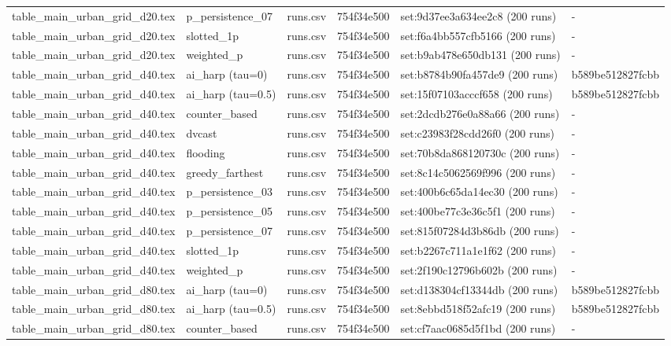 \begin{tabular}{llllll}
table\_main\_urban\_grid\_d20.tex & p\_persistence\_07 & runs.csv & 754f34e500 & set:9d37ee3a634ee2c8 (200 runs) & - \\
table\_main\_urban\_grid\_d20.tex & slotted\_1p & runs.csv & 754f34e500 & set:f6a4bb557cfb5166 (200 runs) & - \\
table\_main\_urban\_grid\_d20.tex & weighted\_p & runs.csv & 754f34e500 & set:b9ab478e650db131 (200 runs) & - \\
table\_main\_urban\_grid\_d40.tex & ai\_harp (tau=0) & runs.csv & 754f34e500 & set:b8784b90fa457de9 (200 runs) & b589be512827fcbb \\
table\_main\_urban\_grid\_d40.tex & ai\_harp (tau=0.5) & runs.csv & 754f34e500 & set:15f07103acccf658 (200 runs) & b589be512827fcbb \\
table\_main\_urban\_grid\_d40.tex & counter\_based & runs.csv & 754f34e500 & set:2dcdb276e0a88a66 (200 runs) & - \\
table\_main\_urban\_grid\_d40.tex & dvcast & runs.csv & 754f34e500 & set:c23983f28cdd26f0 (200 runs) & - \\
table\_main\_urban\_grid\_d40.tex & flooding & runs.csv & 754f34e500 & set:70b8da868120730c (200 runs) & - \\
table\_main\_urban\_grid\_d40.tex & greedy\_farthest & runs.csv & 754f34e500 & set:8c14c5062569f996 (200 runs) & - \\
table\_main\_urban\_grid\_d40.tex & p\_persistence\_03 & runs.csv & 754f34e500 & set:400b6c65da14ec30 (200 runs) & - \\
table\_main\_urban\_grid\_d40.tex & p\_persistence\_05 & runs.csv & 754f34e500 & set:400be77c3e36c5f1 (200 runs) & - \\
table\_main\_urban\_grid\_d40.tex & p\_persistence\_07 & runs.csv & 754f34e500 & set:815f07284d3b86db (200 runs) & - \\
table\_main\_urban\_grid\_d40.tex & slotted\_1p & runs.csv & 754f34e500 & set:b2267c711a1e1f62 (200 runs) & - \\
table\_main\_urban\_grid\_d40.tex & weighted\_p & runs.csv & 754f34e500 & set:2f190c12796b602b (200 runs) & - \\
table\_main\_urban\_grid\_d80.tex & ai\_harp (tau=0) & runs.csv & 754f34e500 & set:d138304cf13344db (200 runs) & b589be512827fcbb \\
table\_main\_urban\_grid\_d80.tex & ai\_harp (tau=0.5) & runs.csv & 754f34e500 & set:8ebbd518f52afc19 (200 runs) & b589be512827fcbb \\
table\_main\_urban\_grid\_d80.tex & counter\_based & runs.csv & 754f34e500 & set:cf7aac0685d5f1bd (200 runs) & - \\

\end{tabular}
